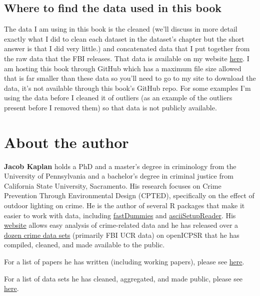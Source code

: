 \documentclass[
  12pt,
  openany]{book}
\begin{document}
\hypertarget{where-to-find-the-data-used-in-this-book}{%
\section*{Where to find the data used in this book}\label{where-to-find-the-data-used-in-this-book}}


The data I am using in this book is the cleaned (we'll discuss in more detail exactly what I did to clean each dataset in the dataset's chapter but the short answer is that I did very little.) and concatenated data that I put together from the raw data that the FBI releases. That data is available on my website \href{https://jacobdkaplan.com/data.html}{here}. I am hosting this book through GitHub which has a maximum file size allowed that is far smaller than these data so you'll need to go to my site to download the data, it's not available through this book's GitHub repo. For some examples I'm using the data before I cleaned it of outliers (as an example of the outliers present before I removed them) so that data is not publicly available.

\hypertarget{about-the-author}{%
\chapter*{About the author}\label{about-the-author}}


\textbf{Jacob Kaplan} holds a PhD and a master's degree in criminology from the University of Pennsylvania and a bachelor's degree in criminal justice from California State University, Sacramento. His research focuses on Crime Prevention Through Environmental Design (CPTED), specifically on the effect of outdoor lighting on crime. He is the author of several R packages that make it easier to work with data, including \href{https://jacobkap.github.io/fastDummies/}{fastDummies} and \href{https://jacobkap.github.io/asciiSetupReader/}{asciiSetupReader}. His \href{http://jacobdkaplan.com/}{website} allows easy analysis of crime-related data and he has released over a \href{http://jacobdkaplan.com/data.html}{dozen crime data sets} (primarily FBI UCR data) on openICPSR that he has compiled, cleaned, and made available to the public.

For a list of papers he has written (including working papers), please see \href{http://jacobdkaplan.com/research.html}{here}.

For a list of data sets he has cleaned, aggregated, and made public, please see \href{http://jacobdkaplan.com/data.html}{here}.
\end{document}

